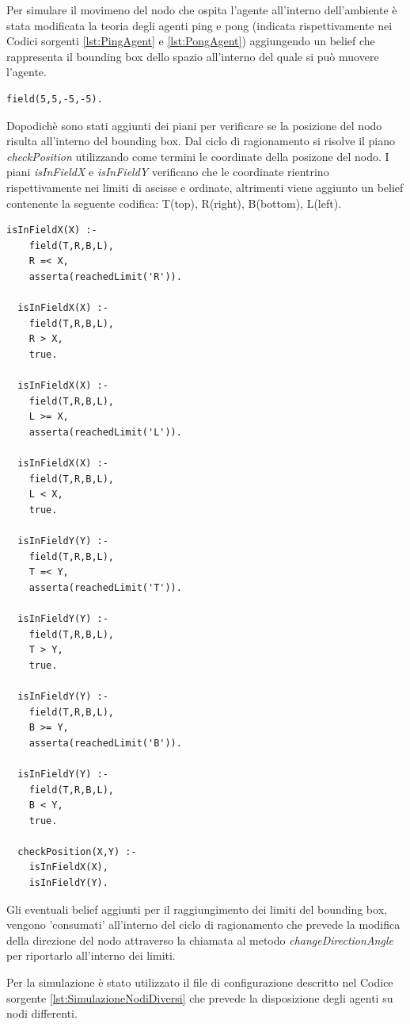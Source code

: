 \documentclass[12pt,a4paper,openright,twoside]{report}
\begin{document}
Per simulare il movimeno del nodo che ospita l'agente all'interno dell'ambiente \`e stata modificata la teoria degli agenti ping e pong (indicata rispettivamente nei Codici sorgenti \ref{lst:PingAgent} e \ref{lst:PongAgent}) aggiungendo un belief che rappresenta il bounding box dello spazio all'interno del quale si pu\`o muovere l'agente.
\medskip
\begin{lstlisting}[firstnumber=1,caption={Bounding-box}]
  field(5,5,-5,-5).
\end{lstlisting}
Dopodich\`e sono stati aggiunti dei piani per verificare se la posizione del nodo risulta all'interno del bounding box. Dal ciclo di ragionamento si risolve il piano \textit{checkPosition} utilizzando come termini le coordinate della posizone del nodo.
I piani \textit{isInFieldX} e \textit{isInFieldY} verificano che le coordinate rientrino rispettivamente nei limiti di ascisse e ordinate, altrimenti viene aggiunto un belief contenente la seguente codifica: T(top), R(right), B(bottom), L(left).
\medskip
\begin{lstlisting}[firstnumber=18,caption={Piani per la gestione del bounding-box}]
  isInFieldX(X) :-
    field(T,R,B,L),
    R =< X,
    asserta(reachedLimit('R')).

  isInFieldX(X) :-
    field(T,R,B,L),
    R > X,
    true.

  isInFieldX(X) :-
    field(T,R,B,L),
    L >= X,
    asserta(reachedLimit('L')).

  isInFieldX(X) :-
    field(T,R,B,L),
    L < X,
    true.

  isInFieldY(Y) :-
    field(T,R,B,L),
    T =< Y,
    asserta(reachedLimit('T')).

  isInFieldY(Y) :-
    field(T,R,B,L),
    T > Y,
    true.

  isInFieldY(Y) :-
    field(T,R,B,L),
    B >= Y,
    asserta(reachedLimit('B')).

  isInFieldY(Y) :-
    field(T,R,B,L),
    B < Y,
    true.

  checkPosition(X,Y) :-
    isInFieldX(X),
    isInFieldY(Y).
\end{lstlisting}
Gli eventuali belief aggiunti per il raggiungimento dei limiti del bounding box, vengono 'consumati' all'interno del ciclo di ragionamento che prevede la modifica della direzione del nodo attraverso la chiamata al metodo \textit{changeDirectionAngle} per riportarlo all'interno dei limiti.

\bigskip

Per la simulazione \`e stato utilizzato il file di configurazione descritto nel Codice sorgente \ref{lst:SimulazioneNodiDiversi} che prevede la disposizione degli agenti su nodi differenti.
\end{document}

